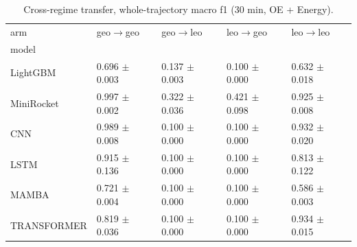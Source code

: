 \begin{table}
\caption{Cross-regime transfer, whole-trajectory macro f1 (30 min, OE + Energy).}
\label{tab:total_transfer_f1}
\begin{tabular}{lllll}
\toprule
arm & geo$\rightarrow$geo & geo$\rightarrow$leo & leo$\rightarrow$geo & leo$\rightarrow$leo \\
model &  &  &  &  \\
\midrule
LightGBM & 0.696 $\pm$ 0.003 & 0.137 $\pm$ 0.003 & 0.100 $\pm$ 0.000 & 0.632 $\pm$ 0.018 \\
MiniRocket & 0.997 $\pm$ 0.002 & 0.322 $\pm$ 0.036 & 0.421 $\pm$ 0.098 & 0.925 $\pm$ 0.008 \\
CNN & 0.989 $\pm$ 0.008 & 0.100 $\pm$ 0.000 & 0.100 $\pm$ 0.000 & 0.932 $\pm$ 0.020 \\
LSTM & 0.915 $\pm$ 0.136 & 0.100 $\pm$ 0.000 & 0.100 $\pm$ 0.000 & 0.813 $\pm$ 0.122 \\
MAMBA & 0.721 $\pm$ 0.004 & 0.100 $\pm$ 0.000 & 0.100 $\pm$ 0.000 & 0.586 $\pm$ 0.003 \\
TRANSFORMER & 0.819 $\pm$ 0.036 & 0.100 $\pm$ 0.000 & 0.100 $\pm$ 0.000 & 0.934 $\pm$ 0.015 \\
\bottomrule
\end{tabular}
\end{table}
